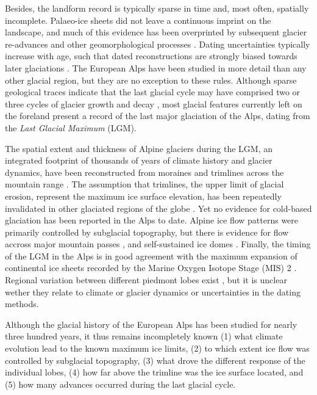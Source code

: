 \documentclass[tc, manuscript]{copernicus}
\begin{document}
    Besides, the landform record is typically sparse in time and, most often,
    spatially incomplete. Palaeo-ice sheets did not leave a continuous imprint
    on the landscape, and much of this evidence has been overprinted by
    subsequent glacier re-advances and other geomorphological processes
    \citep[e.g.,][]{Kleman.1994, Kleman.etal.2006, Kleman.etal.2010}. Dating
    uncertainties typically increase with age, such that dated reconstructions
    are strongly biased towards later glaciations \citep{Heyman.etal.2011}.
    The European Alps have been studied in more detail than any other glacial
    region, but they are no exception to these rules. Although sparse
    geological traces indicate that the last glacial cycle may have comprised
    two or three cycles of glacier growth and decay \citep{Preusser.2004,
    Ivy-Ochs.etal.2008}, most glacial features currently left on the foreland
    present a record of the last major glaciation of the Alps, dating from the
    \emph{Last Glacial Maximum} (LGM).

    The spatial extent and thickness of Alpine glaciers during the LGM, an
    integrated footprint of thousands of years of climate history and glacier
    dynamics, have been reconstructed from moraines and trimlines across the
    mountain range \citep[e.g.,][]{Bini.etal.2009, Coutterand.2010,
    Husen.2011}. The assumption that trimlines, the upper limit of glacial
    erosion, represent the maximum ice surface elevation, has
    been repeatedly invalidated in other glaciated regions of the globe
    \citep[e.g.,][]{Kleman.1994, Kleman.etal.2010, Fabel.etal.2012}. Yet no
    evidence for cold-based glaciation has been reported in the Alps to date.
    Alpine ice flow
    patterns were primarily controlled by subglacial topography, but there is
    evidence for flow accross major mountain passes
    \citep[e.g.,][]{Coutterand.2010, Kelly.etal.2004, Husen.2011}, and
    self-sustained ice domes \citep{Bini.etal.2009}. Finally, the timing of the
    LGM in the Alps \citep{Ivy-Ochs.etal.2008, Monegato.etal.2017} is in good
    agreement with the maximum expansion of continental ice sheets recorded by
    the Marine Oxygen Isotope Stage (MIS) 2
    \citep[29--14\,ka;][]{Lisiecki.Raymo.2005}. Regional variation between
    different piedmont
    lobes exist \citep[Fig.~5]{Wirsig.etal.2016}, but it is unclear wether they
    relate to climate or glacier dynamics \citep{Monegato.etal.2017} or
    uncertainties in the dating methods.

    Although the glacial history of the European Alps has been studied for
    nearly three hundred years, it thus remains incompletely known
      (1) what climate evolution lead to the known maximum ice limits,
      (2) to which extent ice flow was controlled by subglacial topography,
      (3) what drove the different response of the individual lobes,
      (4) how far above the trimline was the ice surface located, and
      (5) how many advances occurred during the last glacial cycle.
\end{document}
